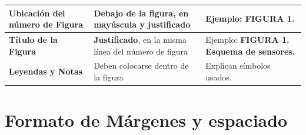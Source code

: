 \documentclass{report}
\newcommand{\greencheck}{{\color{green}\ding{51}}} %
\begin{document}
\begin{longtable}{|p{5cm}|p{5cm}|p{8cm}|}
    \textbf{Ubicación del número de Figura} \greencheck & \textbf{Debajo} de la figura, en \textbf{mayúscula y justificado} & Ejemplo: \textbf{FIGURA 1}. \\ \hline

    \textbf{Título de la Figura} \greencheck & \textbf{Justificado}, en la misma línea del número de figura & Ejemplo: \textbf{FIGURA 1. Esquema de sensores.} \\ \hline

    \textbf{Leyendas y Notas} & Deben colocarse dentro de la figura & Explican símbolos usados. \\ \hline

\end{longtable}


\section*{ \color{red} Formato de Márgenes y espaciado \greencheck}
\end{document}
